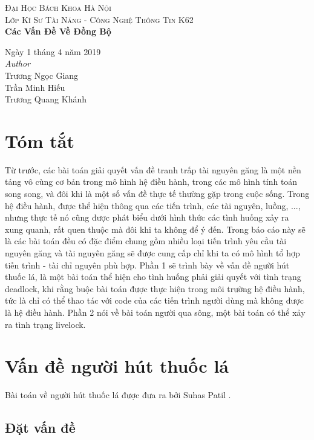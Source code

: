 \documentclass[a4paper]{article}
\begin{document}
\textsc{\LARGE Đại Học Bách Khoa Hà Nội} \\[1,5cm]
	\textsc{\large Lớp Kĩ Sư Tài Năng - Công Nghệ Thông Tin K62} \\[0.5cm]
	{\huge\bfseries Các Vấn Đề Về Đồng Bộ}\\[0.4cm] 
	
		\begin{flushleft}
			\large
			Ngày 1 tháng 4 năm 2019 \\[0.5cm]
			\textit{Author}\\[0,3cm]
			   Trương Ngọc Giang \\
			   Trần Minh Hiếu  \\
			   Trương Quang Khánh \\
		\end{flushleft}
		
	\section*{Tóm tắt}
	Từ trước, các bài toán giải quyết vấn đề tranh trấp tài nguyên găng là một nền tảng vô cùng cơ bản trong 
	mô hình hệ điều hành, trong các mô hình tính toán song song, và đôi khi là một số vấn đề thực tế thường gặp
	trong cuộc sống. Trong hệ điều hành, được thể hiện thông qua các tiến trình, các tài nguyên, luồng, ..., 
	nhưng thực tế nó cũng được phát biểu dưới hình thức các tình huống xảy ra xung quanh, rất quen thuộc mà 
	đôi khi ta không để ý đến. Trong báo cáo này sẽ là các bài toán đều có đặc điểm chung gồm nhiều loại tiến 
	trình yêu cầu tài nguyên găng và tài nguyên găng sẽ được cung cấp chỉ khi ta có mô hình tổ hợp tiến trình - tài chỉ
	nguyên phù hợp. Phần 1 sẽ trình bày về vấn đề người hút thuốc lá, là một bài
	toán thể hiện cho tình huống phải giải quyết với tình trạng deadlock, khi rằng buộc bài toán được thực hiện
	trong môi trường hệ điều hành, tức là chỉ có thể thao tác với code của các tiến trình người dùng mà không 
	được là hệ điều hành. Phần 2 nói về bài toán người qua sông, một bài toán có thể xảy ra tình trạng livelock.
	
	
	\tableofcontents
	\newpage
	
	
	\section{Vấn đề người hút thuốc lá}
	Bài toán về người hút thuốc lá được đưa ra bởi Suhas Patil \cite{littlebook4}.
	\subsection{Đặt vấn đề}
	
\end{document}
